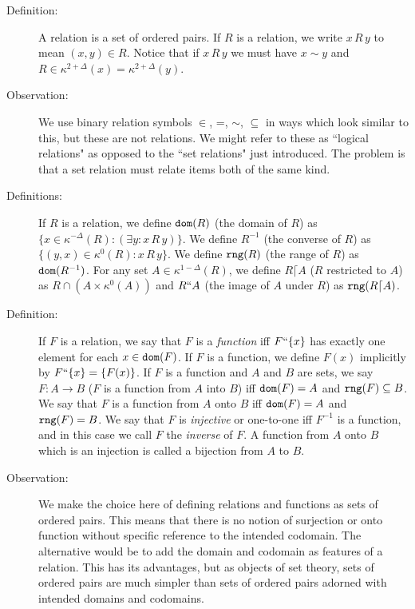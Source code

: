 \documentclass[12pt]{article}
\begin{document}
\begin{description}

\item[Definition:]  A relation is a set of ordered pairs.  If $R$ is a relation, we write $x\,R\,y$ to mean $(x,y) \in R$.
Notice that if $x \,R\,y$ we must have $x \sim y$ and $R \in \kappa^{2+\Delta}(x)=\kappa^{2+\Delta}(y)$.

\item[Observation:]  We use binary relation symbols $\in$, =, $\sim$, $\subseteq$ in ways which look similar to this, but these are not relations.  We might refer to these as ``logical relations" as opposed to the ``set relations" just introduced.  The problem is that a set relation must relate items both of the same kind.

\item[Definitions:]  If $R$ is a relation, we define ${\tt dom}(R)$ (the domain of $R$) as $\{x \in \kappa^{-\Delta}(R):(\exists y:x \, R \, y)\}$.
We define $R^{-1}$ (the converse of $R$) as $\{(y,x) \in \kappa^0(R):x \,R\,y\}$.  We define ${\tt rng}(R)$ (the range of $R$) as ${\tt dom}(R^{-1})$.  For any set $A \in \kappa^{1-\Delta}(R)$, we define $R \lceil A$ ($R$ restricted to $A$) as $R \cap (A \times \kappa^0(A))$ and $R``A$ (the image of $A$ under $R$) as ${\tt rng}(R \lceil A)$.

\item[Definition:]  If $F$ is a relation, we say that $F$ is a {\em function\/} iff $F``\{x\}$ has exactly one element for each $x\in {\tt dom}(F)$.  If $F$ is a function, we define $F(x)$ implicitly by $F``\{x\} = \{F(x)\}$.  If $F$ is a function and $A$ and $B$ are sets, we say $F:A \rightarrow B$ ($F$ is a function from $A$ into $B$) iff ${\tt dom}(F)=A$ and ${\tt rng}(F) \subseteq B$.  We say that $F$ is a function from $A$ onto $B$ iff ${\tt dom}(F)=A$ and ${\tt rng}(F) = B$.   We say that $F$ is {\em injective\/} or one-to-one iff $F^{-1}$ is a function, and in this case we call $F$ the {\em inverse\/} of $F$.  A function from $A$ onto $B$ which is an injection is called a bijection from $A$ to $B$.

\item[Observation:]  We make the choice here of defining relations and functions as sets of ordered pairs.  This means that there is no notion of surjection or onto function without specific reference to the intended codomain.  The alternative would be to add the domain and codomain as features of a relation.  This has its advantages, but as objects of set theory, sets of ordered pairs are much simpler than sets of ordered pairs adorned with intended domains and codomains.


\end{description}
\end{document}
